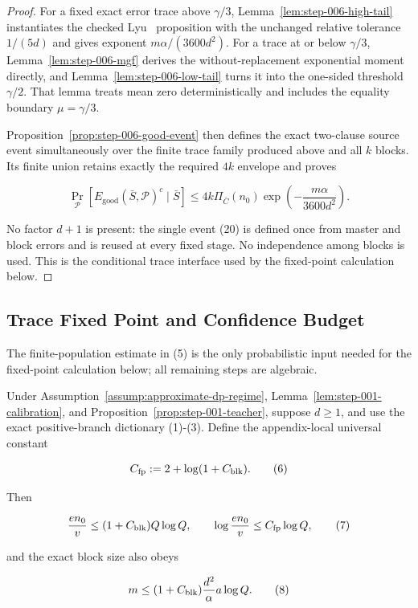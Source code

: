 \begin{proof}
For a fixed exact error trace above \(\gamma/3\),
Lemma~\ref{lem:step-006-high-tail} instantiates the checked Lyu~\citep{lyu2025} proposition
with the unchanged relative tolerance \(1/(5d)\) and gives exponent
\(m\alpha/(3600d^2)\).  For a trace at or below \(\gamma/3\),
Lemma~\ref{lem:step-006-mgf} derives the without-replacement exponential
moment directly, and Lemma~\ref{lem:step-006-low-tail} turns it into the
one-sided threshold \(\gamma/2\).  That lemma treats mean zero
deterministically and includes the equality boundary \(\mu=\gamma/3\).

Proposition~\ref{prop:step-006-good-event} then defines the exact two-clause
source event simultaneously over the finite trace family produced above and
all \(k\) blocks.  Its finite union retains exactly
the required \(4k\) envelope and proves

\[
 \Pr_{\mathcal P}
 [E_{\mathrm{good}}(\bar S,\mathcal P)^c\mid\bar S]
 \leq4k\Pi_{\bar C}(n_0)
 \exp\!\left(-\frac{m\alpha}{3600d^2}\right).
\tag{26}
\]

No factor \(d+1\) is present: the single event (20) is defined once from
master and block errors and is reused at every fixed stage. No
independence among blocks is used.  This is the conditional trace interface
used by the fixed-point calculation below.



\end{proof}

\subsection{Trace Fixed Point and Confidence Budget}\label{app:step_007}


The finite-population estimate in (5) is the only probabilistic input needed
for the fixed-point calculation below; all remaining steps are algebraic.



\begin{lemma}\label{lem:step-007-fixed-point}
Under Assumption~\ref{assump:approximate-dp-regime}, Lemma~\ref{lem:step-001-calibration}, and Proposition~\ref{prop:step-001-teacher}, suppose \(d\ge1\), and use the
exact positive-branch dictionary (1)-(3). Define the appendix-local
universal constant

\[
 C_{\rm fp}:=2+\log(1+C_{\rm blk}).
\tag{6}
\]

Then

\[
 \frac{en_0}{v}\le(1+C_{\rm blk})Q\log Q,
 \qquad
 \log\frac{en_0}{v}\le C_{\rm fp}\log Q,
\tag{7}
\]

and the exact block size also obeys

\[
 m\le(1+C_{\rm blk})
 \frac{d^2}{\alpha}a\log Q.
\tag{8}
\]


\end{lemma}

